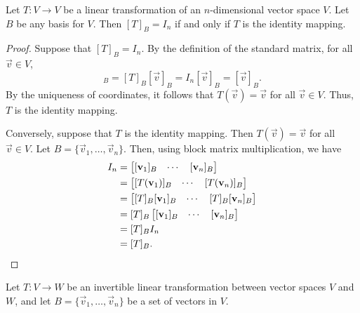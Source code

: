 \documentclass{homework}
\begin{document}
	\question Let $T : V \to V$ be a linear transformation of an $n$-dimensional vector space $V$. Let $B$ be any basis for $V$. Then $[T]_B = I_n$ if and only if $T$ is the identity mapping.
	\begin{proof}
		Suppose that $[T]_B = I_n$. By the definition of the standard matrix, for all $\vec{v} \in V$,
		\begin{equation*}
			[T(\vec{v})]_B = [T]_B[\vec{v}]_B = I_n[\vec{v}]_B = [\vec{v}]_B.
		\end{equation*}
		By the uniqueness of coordinates, it follows that $T(\vec{v}) = \vec{v}$ for all $\vec{v} \in V$. Thus, $T$ is the identity mapping.
		
		Conversely, suppose that $T$ is the identity mapping. Then $T(\vec{v}) = \vec{v}$ for all $\vec{v} \in V$. Let $B = \{\vec{v}_1, \dots, \vec{v}_n\}$. Then, using block matrix multiplication, we have
		\begin{equation*}
			\begin{aligned}
			I_n &= \left[\begin{matrix}[\mathbf{v}_1]_B & \cdots& [\mathbf{v}_n]_B\end{matrix}\right] \\
			&= \left[\begin{matrix}[T(\mathbf{v}_1)]_B & \cdots& [T(\mathbf{v}_n)]_B\end{matrix}\right] \\
			&= \left[\begin{matrix}[T]_B[\mathbf{v}_1]_B & \cdots&[T]_B [\mathbf{v}_n]_B\end{matrix}\right] \\
			&= [T]_B \left[\begin{matrix}[\mathbf{v}_1]_B & \cdots& [\mathbf{v}_n]_B\end{matrix}\right] \\
			&= [T]_B I_n \\
			&= [T]_B.
			\end{aligned}
		\end{equation*}
	\end{proof}
	
	\question 
	
	\question Let $T : V \to W$ be an invertible linear transformation between vector spaces $V$ and $W$, and let $B = \{\vec{v}_1, \dots, \vec{v}_n\}$ be a set of vectors in $V$.
	
\end{document}
